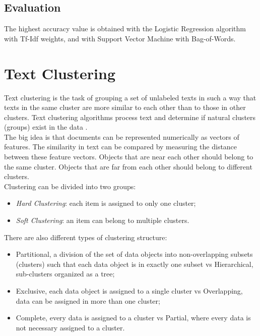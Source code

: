 \documentclass[fleqn,10pt]{SelfArx} %
\begin{document}
\subsection{Evaluation}
The highest accuracy value is obtained with the Logistic Regression algorithm with Tf-Idf weights, and with Support Vector Machine with Bag-of-Words.

\section{Text Clustering}
Text clustering is the task of grouping a set of unlabeled texts in such a way that texts in the same cluster are more similar to each other than to those in other clusters. Text clustering algorithms process text and determine if natural clusters (groups) exist in the data \cite{textClustering}.\\
The big idea is that documents can be represented numerically as vectors of features. The similarity in text can be compared by measuring the distance between these feature vectors. Objects that are near each other should belong to the same cluster. Objects that are far from each other should belong to different clusters.\\
Clustering can be divided into two groups:
\begin{itemize}
	\item \textit{Hard Clustering}: each item is assigned to only one cluster;
	\item \textit{Soft Clustering}: an item can belong to multiple clusters.
\end{itemize}

There are also different types of clustering structure:
\begin{itemize}
	\item Partitional, a division of the set of data objects into non-overlapping subsets (clusters) such that each data object is in exactly one subset vs Hierarchical, sub-clusters organized as a tree;
	\item Exclusive, each data object is assigned to a single cluster vs Overlapping, data can be assigned in more than one cluster;
	\item Complete, every data is assigned to a cluster vs Partial, where every data is not necessary assigned to a cluster.
\end{itemize}
\end{document}
